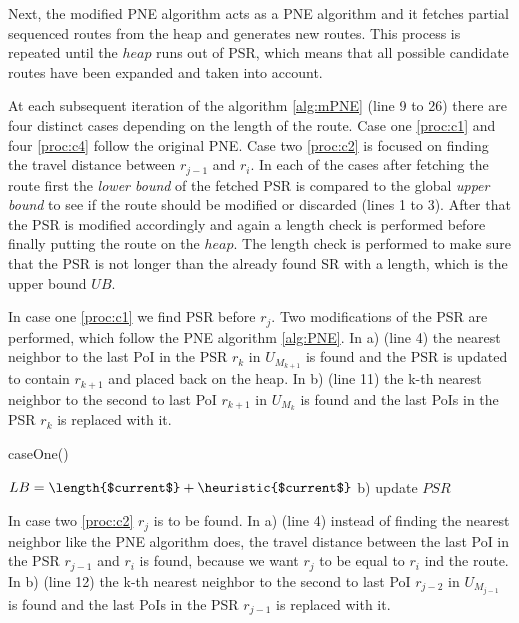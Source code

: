 \pagebreak

Next, the modified PNE algorithm acts as a PNE algorithm and it fetches partial sequenced routes from the heap and generates new routes. This process is repeated until the $heap$ runs out of PSR, which means that all possible candidate routes have been expanded and taken into account.

At each subsequent iteration of the algorithm \ref{alg:mPNE} (line 9 to 26) there are four distinct cases depending on the length of the route. Case one \ref{proc:c1} and four \ref{proc:c4} follow the original PNE. Case two \ref{proc:c2} is focused on finding the travel distance between $r_{j-1}$ and $r_i$. In each of the cases after fetching the route first the \textit{lower bound} of the fetched PSR is compared to the global \textit{upper bound} to see if the route should be modified or discarded (lines 1 to 3). After that the PSR is modified accordingly and again a length check is performed before finally putting the route on the $heap$. The length check is performed to make sure that the PSR is not longer than the already found SR with a length, which is the upper bound $UB$.  

In case one \ref{proc:c1} we find PSR before $r_j$. Two modifications of the PSR are performed, which follow the PNE algorithm \ref{alg:PNE}. In a) (line 4) the nearest neighbor to the last PoI in the PSR $r_k$ in $U_{M_{k+1}}$ is found and the PSR is updated to contain $r_{k+1}$ and placed back on the heap. In b) (line 11) the k-th nearest neighbor to the second to last PoI $r_{k+1}$ in $U_{M_{k}}$ is found and the last PoIs in the PSR $r_k$ is replaced with it.

\begin{procedure}[H]
	\label{proc:c1}
	\caption{caseOne()}
	
	$LB = \length{$current$} + \heuristic{$current$}$\;
	b) \;
	update $PSR$\;
\end{procedure}

In case two \ref{proc:c2} $r_j$ is to be found. In a) (line 4) instead of finding the nearest neighbor like the PNE algorithm does, the travel distance between the last PoI in the PSR $r_{j-1}$ and $r_i$ is found, because we want $r_j$ to be equal to $r_i$ ind the route. In b) (line 12) the k-th nearest neighbor to the second to last PoI $r_{j-2}$ in $U_{M_{j-1}}$ is found and the last PoIs in the PSR $r_{j-1}$ is replaced with it.

